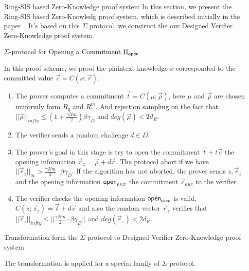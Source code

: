 \begin{section}{Ring-SIS based Zero-Knowledge proof system}
  In this section, we present the Ring-SIS based Zero-Knowledg proof system, which is described initially in the paper~\cite{DBLP:journals/iacr/BaumDOP16}.
  It's based on this $\Sigma$ protocol, we construct the our Designed Verifier Zero-Knowledge proof system.

  \begin{construction}{$\Sigma$-protocol for Opening a Commitment $\Pi_{\mathsf{open}}$}
    
    In this proof scheme, we proof the plaintext knowledge $x$ corresponded to the committed value $\vec{c} = C(x; \vec{r})$.

    \begin{enumerate}
    \item The prover computes a commitment $\vec{t} = C(\mu; \vec{\rho})$, here $\mu$ and $\vec{\rho}$ are chosen uniformly form $R_q$ and $R^m$. 
      And rejection sampling on the fact that $||\vec{\rho}||_{infty} \leq (1+ \frac{\gamma N m}{2}) \beta \gamma_D$ and $deg(\vec{\rho}) < 2 d_R$.
    \item The verifier sends a random challenge $d \in D$.
    \item The prover's goal in this stage is try to open the commitment $\vec{t} + t\vec{c}$ \wrt the opening information $\vec{r}_z = \vec{\rho} + d\vec{r}$.
      The protocol abort if we have $||\vec{r}_z||_{\infty} > \frac{\gamma N m}{2} \cdot \beta \gamma_D$. 
      If the algorithm has not aborted, the prover sends $z, \vec{r}_z$ and the opening information $\mathsf{open}_{aux}$ \wrt the commitment $\vec{c}_{aux}$ to the verifier.
    \item The verifier checks the opening information $\mathsf{open}_{aux}$ is valid, $C(z; \vec{z}_r) = \vec{t} + d \vec{c}$
      and also the random vector $\vec{r}_z$ verifies that $||\vec{r}_z||_{infty} \leq ||\frac{\gamma N m}{2} \cdot \beta \gamma_D||$ and $deg(\vec{r}_z) < 2d_R$.
    \end{enumerate}
  \end{construction}

\end{section}

\begin{section}{Transformation form the $\Sigma$-protocol to Designed Verifier Zero-Knowledge proof system}
  
  The transformation is applied for a special family of $\Sigma$-protocol.
  
\end{section}